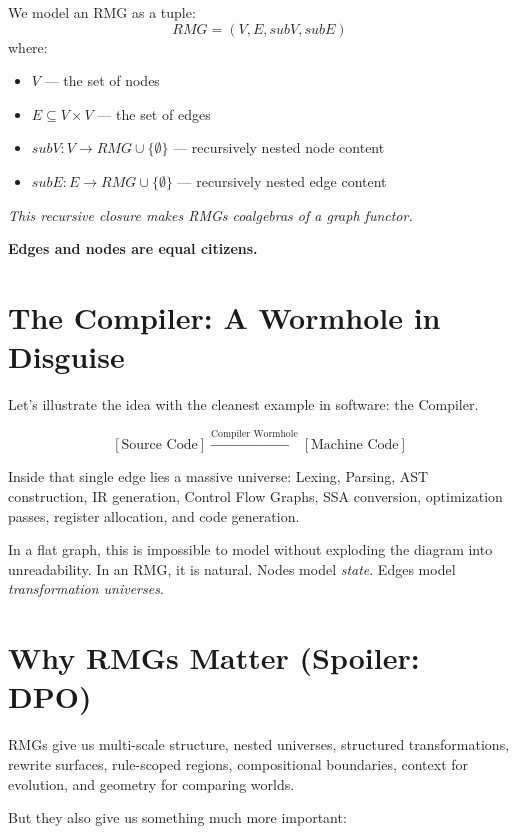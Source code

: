 \begin{tcolorbox}[colback=gray!10, colframe=black, title=\textbf{📦 FOR THE NERDS™: Formal Shape of an RMG}]
We model an RMG as a tuple:
\[ RMG = (V, E, subV, subE) \]
where:
\begin{itemize}
    \item $V$ — the set of nodes
    \item $E \subseteq V \times V$ — the set of edges
    \item $subV: V \rightarrow RMG \cup \{\emptyset\}$ — recursively nested node content
    \item $subE: E \rightarrow RMG \cup \{\emptyset\}$ — recursively nested edge content
\end{itemize}

\textit{This recursive closure makes RMGs coalgebras of a graph functor.}

\textbf{Edges and nodes are equal citizens.}
\end{tcolorbox}

\section{The Compiler: A Wormhole in Disguise}
\label{sec:compiler-wormhole}

Let's illustrate the idea with the cleanest example in software: the Compiler.

\[ [\text{Source Code}] \xrightarrow{\text{Compiler Wormhole}} [\text{Machine Code}] \]

Inside that single edge lies a massive universe: Lexing, Parsing, AST construction, IR generation, Control Flow Graphs, SSA conversion, optimization passes, register allocation, and code generation.

In a flat graph, this is impossible to model without exploding the diagram into unreadability. In an RMG, it is natural. Nodes model \textit{state}. Edges model \textit{transformation universes}.

\section{Why RMGs Matter (Spoiler: DPO)}
\label{sec:rmg-matter}

RMGs give us multi-scale structure, nested universes, structured transformations, rewrite surfaces, rule-scoped regions, compositional boundaries, context for evolution, and geometry for comparing worlds.

But they also give us something much more important:

